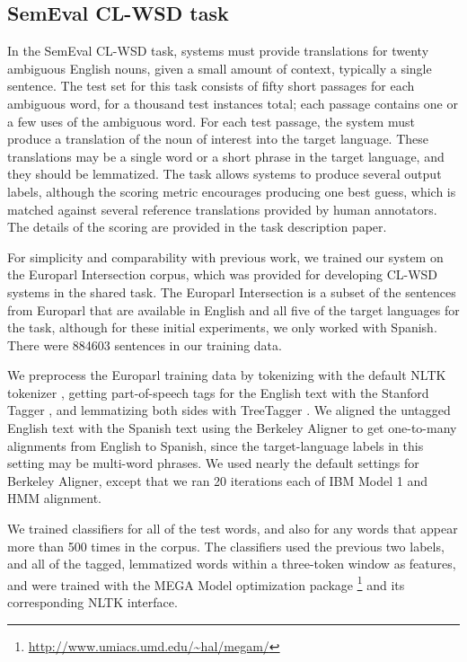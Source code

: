 \documentclass[11pt]{article}
\begin{document}
\subsection{SemEval CL-WSD task}
In the SemEval CL-WSD task, systems must provide translations for twenty
ambiguous English nouns, given a small amount of context, typically a single
sentence. The test set for this task consists of fifty short passages for each
ambiguous word, for a thousand test instances total; each passage contains one
or a few uses of the ambiguous word. For each test passage, the system must
produce a translation of the noun of interest into the target language.  These
translations may be a single word or a short phrase in the target language, and
they should be lemmatized. The task allows systems to produce several output
labels, although the scoring metric encourages producing one best guess, which
is matched against several reference translations provided by human annotators.
The details of the scoring are provided in the task description paper.

For simplicity and comparability with previous work, we trained our system on
the Europarl Intersection corpus, which was provided for developing CL-WSD
systems in the shared task.  The Europarl Intersection is a subset of the
sentences from Europarl \cite{europarl} that are available in English and all
five of the target languages for the task, although for these initial
experiments, we only worked with Spanish. There were 884603 sentences in our
training data.

We preprocess the Europarl training data by tokenizing with the default NLTK
tokenizer \cite{nltkbook}, getting part-of-speech tags for the English text
with the Stanford Tagger \cite{Toutanova03feature-richpart-of-speech}, and
lemmatizing both sides with TreeTagger \cite{Schmid95improvementsin}.  We
aligned the untagged English text with the Spanish text using the Berkeley
Aligner \cite{denero-klein:2007:ACLMain} to get one-to-many alignments from
English to Spanish, since the target-language labels in this setting may be
multi-word phrases. We used nearly the default settings for Berkeley Aligner,
except that we ran 20 iterations each of IBM Model 1 and HMM alignment.

We trained classifiers for all of the test words, and also for any words that
appear more than 500 times in the corpus. The classifiers used the previous two
labels, and all of the tagged, lemmatized words within a three-token window as
features, and were trained with the MEGA Model optimization package
\footnote{\url{http://www.umiacs.umd.edu/~hal/megam/}} and its corresponding
NLTK interface.
\end{document}
